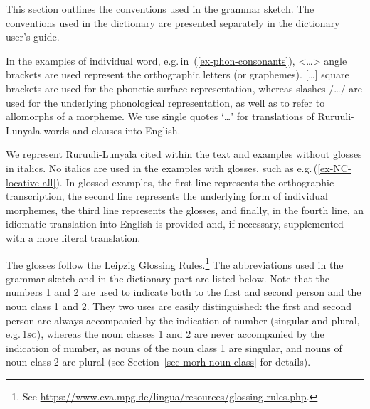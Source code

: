 
This section outlines the conventions used in the grammar sketch. 
The conventions used in the dictionary are presented separately in the dictionary user's guide.

In  the examples of individual word, e.g.\,in~(\ref{ex-phon-consonants}), <…> angle brackets are used represent the orthographic letters (or graphemes). 
[…] square brackets are used for the phonetic surface representation, whereas slashes /…/ are used for the underlying phonological representation, as well as to refer to allomorphs of a morpheme. 
We use single quotes `…' for translations of Ru\-ruu\-li\hyp{}Lu\-nya\-la words and clauses into English. 

We represent Ru\-ruu\-li\hyp{}Lu\-nya\-la cited within the text and examples without glosses in italics. 
No italics are used in the examples with glosses, such as e.g.\,(\ref{ex-NC-locative-all}). 
In glossed examples, the first line represents the orthographic transcription, the second line represents the underlying form of individual morphemes, the third line represents the glosses, and finally, in the fourth line, an idiomatic translation into English is provided and, if necessary, supplemented with a more literal translation.

The glosses follow the Leipzig Glossing Rules.\footnote{See \url{https://www.eva.mpg.de/lingua/resources/glossing-rules.php}.} The abbreviations used in the grammar sketch and in the dictionary part are listed below. 
Note that the numbers 1 and 2 are used to indicate both to the first and second person and the noun class 1 and 2. 
They two uses are easily distinguished: the first and second person are always accompanied by the indication of number (singular and plural, e.g.\,1\textsc{sg}), whereas the noun classes 1 and 2 are never accompanied by the indication of number, as nouns of the noun class 1 are singular, and nouns of noun class 2 are plural (see Section~\ref{sec-morh-noun-class} for details).

